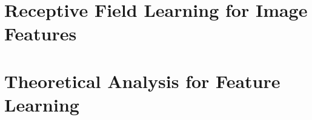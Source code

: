 \chapter{Receptive Field Learning for Image Features}\label{chapter:pooling}



\chapter{Theoretical Analysis for Feature Learning}\label{chapter:nystrom}


